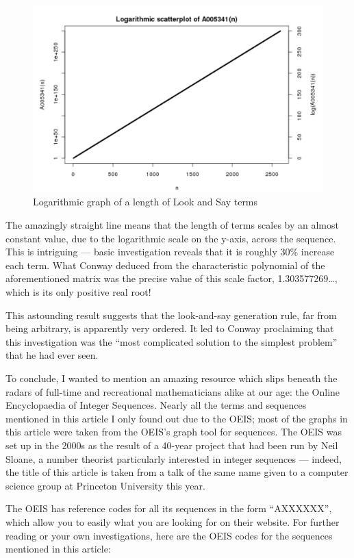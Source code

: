 \documentclass[11pt,a4paper]{report}
\begin{document}
	\begin{figure}
		\caption{Logarithmic graph of a length of Look and Say terms}
		\centering
		\includegraphics[width=0.5\linewidth]{LookAndSayLength.JPG}
	\end{figure}
	
	\begin{multicols}{2}
		
		The amazingly straight line means that the length of terms scales by an almost constant value, due to the logarithmic scale on the y-axis, across the sequence. This is intriguing --- basic investigation reveals that it is roughly 30\% increase each term. What Conway deduced from the characteristic polynomial of the aforementioned matrix was the precise value of this scale factor, 1.303577269\ldots, which is its only positive real root!\par
		This astounding result suggests that the look-and-say generation rule, far from being arbitrary, is apparently very ordered. It led to Conway proclaiming that this investigation was the “most complicated solution to the simplest problem” that he had ever seen.\par
		To conclude, I wanted to mention an amazing resource which slips beneath the radars of full-time and recreational mathematicians alike at our age: the Online Encyclopaedia of Integer Sequences. Nearly all the terms and sequences mentioned in this article I only found out due to the OEIS; most of the graphs in this article were taken from the OEIS’s graph tool for sequences. The OEIS was set up in the 2000s as the result of a 40-year project that had been run by Neil Sloane, a number theorist particularly interested in integer sequences --- indeed, the title of this article is taken from a talk of the same name given to a computer science group at Princeton University this year.\par
		The OEIS has reference codes for all its sequences in the form “AXXXXXX”, which allow you to easily what you are looking for on their website. For further reading or your own investigations, here are the OEIS codes for the sequences mentioned in this article:
		

\end{multicols}
\end{document}
